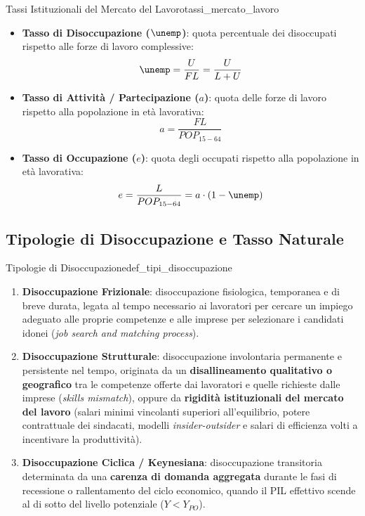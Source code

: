 \begin{definizione}{Tassi Istituzionali del Mercato del Lavoro}{tassi_mercato_lavoro}
\begin{itemize}
    \item \textbf{Tasso di Disoccupazione ($\unemp$)}: quota percentuale dei disoccupati rispetto alle forze di lavoro complessive:
    \begin{equation}
        \unemp = \frac{U}{FL} = \frac{U}{L + U}
    \end{equation}
    \item \textbf{Tasso di Attività / Partecipazione ($a$)}: quota delle forze di lavoro rispetto alla popolazione in età lavorativa:
    \begin{equation}
        a = \frac{FL}{POP_{15-64}}
    \end{equation}
    \item \textbf{Tasso di Occupazione ($e$)}: quota degli occupati rispetto alla popolazione in età lavorativa:
    \begin{equation}
        e = \frac{L}{POP_{15-64}} = a \cdot (1 - \unemp)
    \end{equation}
\end{itemize}
\end{definizione}

\subsection{Tipologie di Disoccupazione e Tasso Naturale}

\begin{definizione}{Tipologie di Disoccupazione}{def_tipi_disoccupazione}
\begin{enumerate}
    \item \textbf{Disoccupazione Frizionale}: disoccupazione fisiologica, temporanea e di breve durata, legata al tempo necessario ai lavoratori per cercare un impiego adeguato alle proprie competenze e alle imprese per selezionare i candidati idonei (\textit{job search and matching process}).
    \item \textbf{Disoccupazione Strutturale}: disoccupazione involontaria permanente e persistente nel tempo, originata da un \textbf{disallineamento qualitativo o geografico} tra le competenze offerte dai lavoratori e quelle richieste dalle imprese (\textit{skills mismatch}), oppure da \textbf{rigidità istituzionali del mercato del lavoro} (salari minimi vincolanti superiori all'equilibrio, potere contrattuale dei sindacati, modelli \textit{insider-outsider} e salari di efficienza volti a incentivare la produttività).
    \item \textbf{Disoccupazione Ciclica / Keynesiana}: disoccupazione transitoria determinata da una \textbf{carenza di domanda aggregata} durante le fasi di recessione o rallentamento del ciclo economico, quando il PIL effettivo scende al di sotto del livello potenziale ($Y < Y_{PO}$).
\end{enumerate}
\end{definizione}

